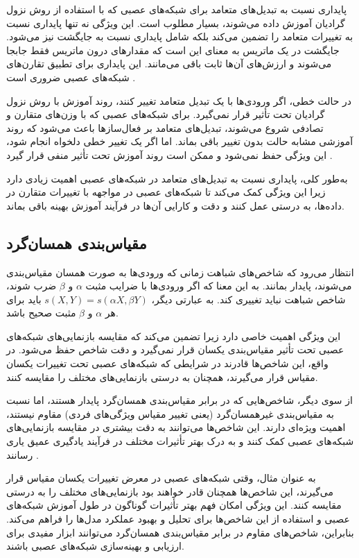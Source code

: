 پایداری نسبت به تبدیل‌های متعامد برای شبکه‌های عصبی که با استفاده از روش نزول گرادیان آموزش داده می‌شوند، بسیار مطلوب است. این ویژگی نه تنها پایداری نسبت به تغییرات متعامد را تضمین می‌کند بلکه شامل پایداری نسبت به جایگشت نیز می‌شود. جایگشت در یک ماتریس به معنای این است که مقدارهای درون ماتریس فقط جابجا می‌شوند و ارزش‌های آن‌ها ثابت باقی می‌مانند. این پایداری برای تطبیق تقارن‌های شبکه‌های عصبی ضروری است
\cite{chen1993geometry, orhan2017skip}.

در حالت خطی، اگر ورودی‌ها با یک تبدیل متعامد تغییر کنند، روند آموزش با روش نزول گرادیان تحت تأثیر قرار نمی‌گیرد. برای شبکه‌های عصبی که با وزن‌های متقارن و تصادفی شروع می‌شوند، تبدیل‌های متعامد بر فعال‌سازها باعث می‌شود که روند آموزشی مشابه حالت بدون تغییر باقی بماند. اما اگر یک تغییر خطی دلخواه انجام شود، این ویژگی حفظ نمی‌شود و ممکن است روند آموزش تحت تأثیر منفی قرار گیرد
\cite{lecun1990second}.

به‌طور کلی، پایداری نسبت به تبدیل‌های متعامد در شبکه‌های عصبی اهمیت زیادی دارد زیرا این ویژگی کمک می‌کند تا شبکه‌های عصبی در مواجهه با تغییرات متقارن در داده‌ها، به درستی عمل کنند و دقت و کارایی آن‌ها در فرآیند آموزش بهینه باقی بماند.



\subsection{مقیاس‌بندی همسان‌گرد}
انتظار می‌رود که شاخص‌های شباهت زمانی که ورودی‌ها به صورت همسان مقیاس‌بندی می‌شوند، پایدار بمانند. به این معنا که اگر ورودی‌ها با ضرایب مثبت \(\alpha\) و \(\beta\) ضرب شوند، شاخص شباهت نباید تغییری کند. به عبارتی دیگر، \( s(X, Y) = s(\alpha X, \beta Y) \) باید برای هر \(\alpha\) و \(\beta\) مثبت صحیح باشد.

این ویژگی اهمیت خاصی دارد زیرا تضمین می‌کند که مقایسه بازنمایی‌های شبکه‌های عصبی تحت تأثیر مقیاس‌بندی یکسان قرار نمی‌گیرد و دقت شاخص حفظ می‌شود. در واقع، این شاخص‌ها قادرند در شرایطی که شبکه‌های عصبی تحت تغییرات یکسان مقیاس قرار می‌گیرند، همچنان به درستی بازنمایی‌های مختلف را مقایسه کنند. 

از سوی دیگر، شاخص‌هایی که در برابر مقیاس‌بندی همسان‌گرد پایدار هستند، اما نسبت به مقیاس‌بندی غیرهمسان‌گرد (یعنی تغییر مقیاس ویژگی‌های فردی) مقاوم نیستند، اهمیت ویژه‌ای دارند. این شاخص‌ها می‌توانند به دقت بیشتری در مقایسه بازنمایی‌های شبکه‌های عصبی کمک کنند و به درک بهتر تأثیرات مختلف در فرآیند یادگیری عمیق یاری رسانند
\cite{kornblith2019similarity}.

به عنوان مثال، وقتی شبکه‌های عصبی در معرض تغییرات یکسان مقیاس قرار می‌گیرند، این شاخص‌ها همچنان قادر خواهند بود بازنمایی‌های مختلف را به درستی مقایسه کنند. این ویژگی امکان فهم بهتر تأثیرات گوناگون در طول آموزش شبکه‌های عصبی و استفاده از این شاخص‌ها برای تحلیل و بهبود عملکرد مدل‌ها را فراهم می‌کند. بنابراین، شاخص‌های مقاوم در برابر مقیاس‌بندی همسان‌گرد می‌توانند ابزار مفیدی برای ارزیابی و بهینه‌سازی شبکه‌های عصبی باشند.



